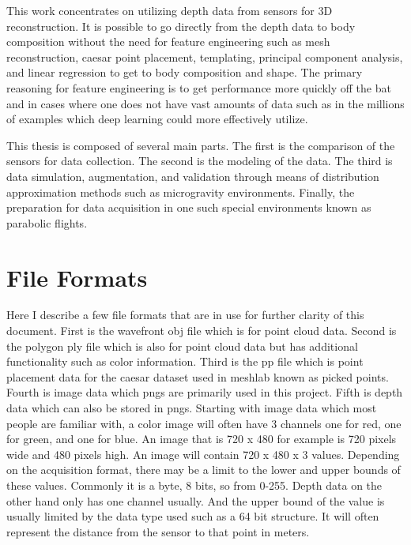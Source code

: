 This work concentrates on utilizing depth data from sensors for 3D reconstruction. It is possible to go directly from the depth data to body composition without the need for feature engineering such as mesh reconstruction, caesar point placement, templating, principal component analysis, and linear regression to get to body composition and shape. The primary reasoning for feature engineering is to get performance more quickly off the bat and in cases where one does not have vast amounts of data such as in the millions of examples which deep learning could more effectively utilize.

This thesis is composed of several main parts. The first is the comparison of the sensors for data collection. The second is the modeling of the data. The third is data simulation, augmentation, and validation through means of distribution approximation methods such as microgravity environments. Finally, the preparation for data acquisition in one such special environments known as parabolic flights.
\section{File Formats}
Here I describe a few file formats that are in use for further clarity of this document. First is the wavefront obj file which is for point cloud data. Second is the polygon ply file which is also for point cloud data but has additional functionality such as color information. Third is the pp file which is point placement data for the caesar dataset used in meshlab known as picked points. Fourth is image data which pngs are primarily used in this project. Fifth is depth data which can also be stored in pngs. Starting with image data which most people are familiar with, a color image will often have 3 channels one for red, one for green, and one for blue. An image that is 720 x 480 for example is 720 pixels wide and 480 pixels high. An image will contain 720 x 480 x 3 values. Depending on the acquisition format, there may be a limit to the lower and upper bounds of these values. Commonly it is a byte, 8 bits, so from 0-255. Depth data on the other hand only has one channel usually. And the upper bound of the value is usually limited by the data type used such as a 64 bit structure. It will often represent the distance from the sensor to that point in meters.


